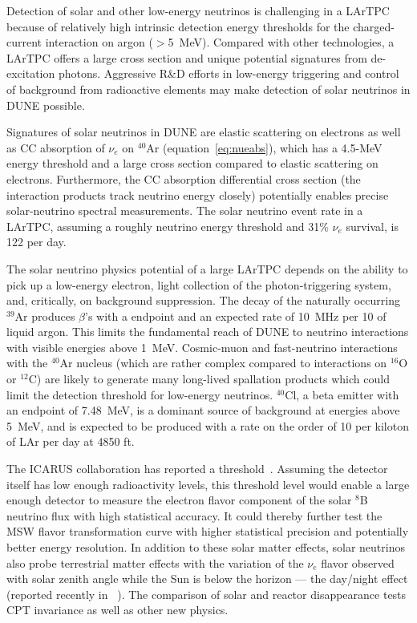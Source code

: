 Detection of solar and other low-energy neutrinos is challenging in
a LArTPC because of relatively high intrinsic detection energy thresholds for
the charged-current interaction on argon ($>$\SI{5}{\MeV}). 
Compared with other technologies, a LArTPC offers a large
cross section and unique potential signatures from de-excitation
photons. Aggressive R\&D efforts in low-energy triggering and
control of background from radioactive elements may make detection
of solar neutrinos in DUNE possible.

Signatures of solar neutrinos in DUNE
are elastic scattering on electrons as well as CC absorption of $\nu_e$ on $^{40}$Ar (equation~\ref{eq:nueabs}), which has a 4.5-MeV energy threshold and a large cross section compared to elastic scattering on electrons.  Furthermore, the CC absorption differential cross section (the interaction products track neutrino energy closely) potentially enables precise solar-neutrino spectral measurements.
The solar neutrino event rate in a
 LArTPC, assuming a roughly  neutrino energy
threshold and 31\% $\nu_e$ survival, is 122 per day.


The solar neutrino physics potential of a large LArTPC depends
on the ability to pick up a low-energy electron, light collection of the photon-triggering system,
and, critically, on background suppression. 
The decay of the naturally occurring $^{39}$Ar
produces $\beta$'s with a  endpoint and an expected rate
of \SI{10}{\MHz} per \SI{10}{\kt} of liquid argon. This limits the
fundamental reach of DUNE to neutrino interactions with visible
energies above \SI{1}{\MeV}. 
Cosmic-muon and fast-neutrino  interactions with the $^{40}$Ar nucleus (which are rather complex
compared to interactions on $^{16}$O or $^{12}$C) are likely to generate many long-lived spallation products which could limit the
detection threshold for low-energy neutrinos.
$^{40}$Cl, a beta emitter with an
endpoint of \SI{7.48}{\MeV}, is a dominant source of background at
energies above \SI{5}{\MeV}, and is expected to be produced with a rate on the order of 10 per kiloton of LAr per day at 4850 ft.



The ICARUS collaboration has reported a 
threshold~\cite{Guglielmi:2012}. Assuming the detector itself
has low enough radioactivity levels, this threshold level would enable
a large enough detector to measure the electron flavor component of
the solar $^8$B neutrino flux with high statistical accuracy. It could 
thereby further test the MSW flavor transformation curve with higher statistical precision and
potentially better energy resolution. 
In addition to these solar
matter effects, solar 
neutrinos also probe terrestrial matter effects
with the variation of the $\nu_e$ flavor observed with solar zenith
angle while the Sun is below the horizon --- the day/night effect (reported recently in ~\cite{Renshaw:2013dzu}). 
The comparison of solar and reactor disappearance tests CPT invariance as well as other new physics.

